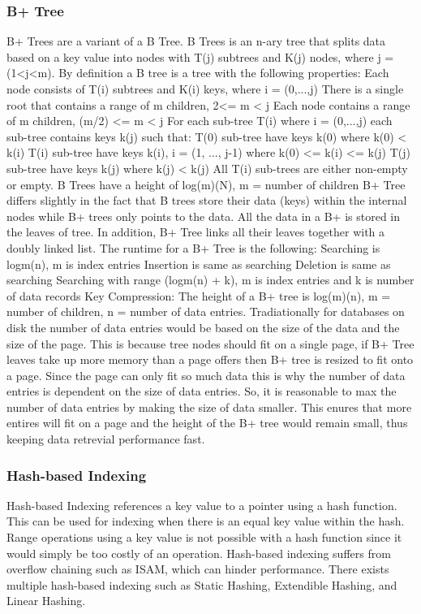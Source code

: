 \documentclass[letterpaper, 12pt]{article}
\begin{document}
\subsubsection{B+ Tree}
B+ Trees are a variant of a B Tree. B Trees is an n-ary tree that splits data
	based on a key value into nodes with T(j) subtrees and K(j) nodes, where j = (1<j<m).
	By definition a B tree is a tree with the following properties:
	Each node consists of T(i) subtrees and K(i) keys, where i = (0,...,j)
	There is a single root that contains a range of m children, 2<= m < j
	Each node contains a range of m children, (m/2) <= m < j
	For each sub-tree T(i) where i = (0,...,j) each sub-tree contains keys k(j) such that:
		T(0) sub-tree have keys k(0) where k(0) < k(i)
		T(i) sub-tree have keys k(i), i = (1, ..., j-1) where k(0) <= k(i) <= k(j)
		T(j) sub-tree have keys k(j) where k(j) < k(j)
	All T(i) sub-trees are either non-empty or empty.
	B Trees have a height of log(m)(N), m = number of children
B+ Tree differs slightly in the fact that B trees store their data (keys) within the internal nodes while B+ trees only points to the data. All the data in a B+ is stored in the leaves of tree. In addition, B+ Tree links all their leaves together with a doubly linked list.
The runtime for a B+ Tree is the following:
Searching is logm(n), m is index entries
Insertion is same as searching
Deletion is same as searching
Searching with range (logm(n) + k), m is index entries and k is number of data records
Key Compression:
The height of a B+ tree is log(m)(n), m = number of children, n = number of data entries.
Tradiationally for databases on disk the number of data entries would be based on the size of the data and
the size of the page. This is because tree nodes should fit on a single page, if B+ Tree leaves take up more memory than a page offers then B+ tree is resized to fit onto a page. Since the page can only fit so much data this is why the number of data entries is dependent on the size of data entries. So, it is reasonable to max the number of data entries by making the size of data smaller. This enures that more entires will fit on a page and the height of the B+ tree would remain small, thus keeping data retrevial performance fast.
\subsubsection{Hash-based Indexing}
	Hash-based Indexing references a key value to a pointer using a hash function. This can be used for indexing when there is an equal key value within the hash. Range operations using a key value is not possible with a hash function since it would simply be too costly of an operation. Hash-based indexing suffers from overflow chaining such as ISAM, which can hinder performance. There exists multiple hash-based indexing such as Static Hashing, Extendible Hashing, and Linear Hashing. 
\end{document}

